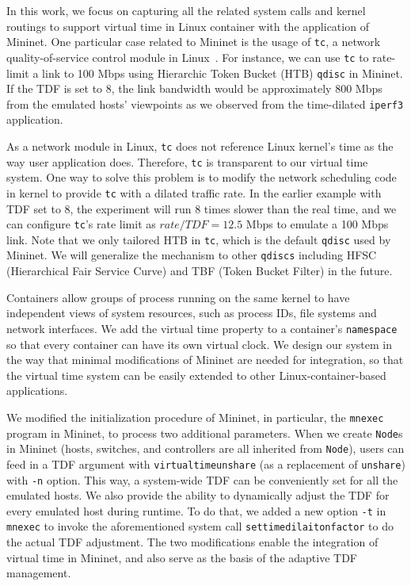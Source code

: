 In this work, we focus on capturing all the related system calls and kernel routings to support virtual time in Linux container with the application of Mininet. 
One particular case related to Mininet is the usage of \texttt{tc}, a network quality-of-service control module in Linux~\cite{TrafficControl}. 
For instance, we can use \texttt{tc} to rate-limit a link to 100 Mbps using Hierarchic Token Bucket (HTB) \texttt{qdisc} in Mininet. If the TDF is set to 8, the link bandwidth would be approximately 800 Mbps from the emulated hosts' viewpoints as we observed from the time-dilated \texttt{iperf3} application.

As a network module in Linux, \texttt{tc} does not reference Linux kernel's time as the way user application does. 
Therefore, \texttt{tc} is transparent to our virtual time system. One way to solve this problem is to modify the network scheduling code in kernel to provide \texttt{tc} with a dilated traffic rate. 
In the earlier example with TDF set to 8, the experiment will run 8 times slower than the real time, and we can configure \texttt{tc}'s rate limit as $rate/TDF=12.5$ Mbps to emulate a 100 Mbps link. 
Note that we only tailored HTB in \texttt{tc}, which is the default \texttt{qdisc} used by Mininet. 
We will generalize the mechanism to other \texttt{qdiscs} including HFSC (Hierarchical Fair Service Curve) and TBF (Token Bucket Filter) in the future.

\label{VT:SubSec:ImplementMininet}
Containers allow groups of process running on the same kernel to have independent views of system resources, such as process IDs, file systems and network interfaces. 
We add the virtual time property to a container's \texttt{namespace}~\cite{LinuxNamespace} so that every container can have its own virtual clock. 
We design our system in the way that minimal modifications of Mininet are needed for integration, so that the virtual time system can be easily extended to other Linux-container-based applications. 

We modified the initialization procedure of Mininet, in particular, the \texttt{mnexec} program in Mininet, to process two additional parameters. 
When we create \texttt{Node}s in Mininet (hosts, switches, and controllers are all inherited from \texttt{Node}), users can feed in a TDF argument with \texttt{virtualtimeunshare} (as a replacement of \texttt{unshare}) with \texttt{-n} option. 
This way, a system-wide TDF can be conveniently set for all the emulated hosts. We also provide the ability to dynamically adjust the TDF for every emulated host during runtime. 
To do that, we added a new option \texttt{-t} in \texttt{mnexec} to invoke the aforementioned system call \texttt{settimedilaitonfactor} to do the actual TDF adjustment. 
The two modifications enable the integration of virtual time in Mininet, and also serve as the basis of the adaptive TDF management.

